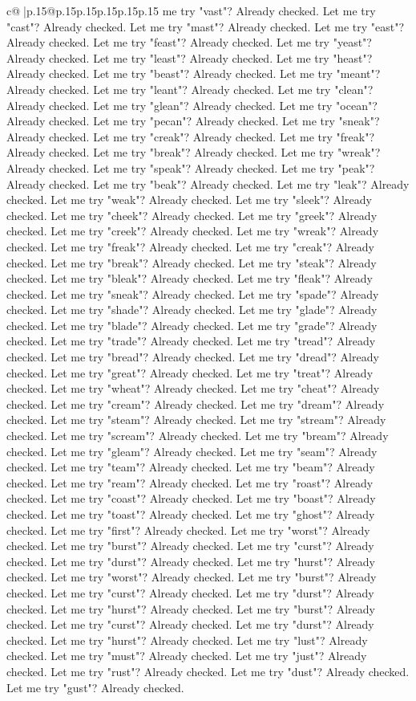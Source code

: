 \documentclass{article}
\begin{document}
{\begin{supertabular}{c@{$\;$}|p{.15\linewidth}@{}p{.15\linewidth}p{.15\linewidth}p{.15\linewidth}p{.15\linewidth}p{.15\linewidth}}
{{{me try "vast"? Already checked. Let me try "cast"? Already checked. Let me try "mast"? Already checked. Let me try "east"? Already checked. Let me try "feast"? Already checked. Let me try "yeast"? Already checked. Let me try "least"? Already checked. Let me try "heast"? Already checked. Let me try "beast"? Already checked. Let me try "meant"? Already checked. Let me try "leant"? Already checked. Let me try "clean"? Already checked. Let me try "glean"? Already checked. Let me try "ocean"? Already checked. Let me try "pecan"? Already checked. Let me try "sneak"? Already checked. Let me try "creak"? Already checked. Let me try "freak"? Already checked. Let me try "break"? Already checked. Let me try "wreak"? Already checked. Let me try "speak"? Already checked. Let me try "peak"? Already checked. Let me try "beak"? Already checked. Let me try "leak"? Already checked. Let me try "weak"? Already checked. Let me try "sleek"? Already checked. Let me try "cheek"? Already checked. Let me try "greek"? Already checked. Let me try "creek"? Already checked. Let me try "wreak"? Already checked. Let me try "freak"? Already checked. Let me try "creak"? Already checked. Let me try "break"? Already checked. Let me try "steak"? Already checked. Let me try "bleak"? Already checked. Let me try "fleak"? Already checked. Let me try "sneak"? Already checked. Let me try "spade"? Already checked. Let me try "shade"? Already checked. Let me try "glade"? Already checked. Let me try "blade"? Already checked. Let me try "grade"? Already checked. Let me try "trade"? Already checked. Let me try "tread"? Already checked. Let me try "bread"? Already checked. Let me try "dread"? Already checked. Let me try "great"? Already checked. Let me try "treat"? Already checked. Let me try "wheat"? Already checked. Let me try "cheat"? Already checked. Let me try "cream"? Already checked. Let me try "dream"? Already checked. Let me try "steam"? Already checked. Let me try "stream"? Already checked. Let me try "scream"? Already checked. Let me try "bream"? Already checked. Let me try "gleam"? Already checked. Let me try "seam"? Already checked. Let me try "team"? Already checked. Let me try "beam"? Already checked. Let me try "ream"? Already checked. Let me try "roast"? Already checked. Let me try "coast"? Already checked. Let me try "boast"? Already checked. Let me try "toast"? Already checked. Let me try "ghost"? Already checked. Let me try "first"? Already checked. Let me try "worst"? Already checked. Let me try "burst"? Already checked. Let me try "curst"? Already checked. Let me try "durst"? Already checked. Let me try "hurst"? Already checked. Let me try "worst"? Already checked. Let me try "burst"? Already checked. Let me try "curst"? Already checked. Let me try "durst"? Already checked. Let me try "hurst"? Already checked. Let me try "burst"? Already checked. Let me try "curst"? Already checked. Let me try "durst"? Already checked. Let me try "hurst"? Already checked. Let me try "lust"? Already checked. Let me try "must"? Already checked. Let me try "just"? Already checked. Let me try "rust"? Already checked. Let me try "dust"? Already checked. Let me try "gust"? Already checked. }}}
\end{supertabular}}
\end{document}
